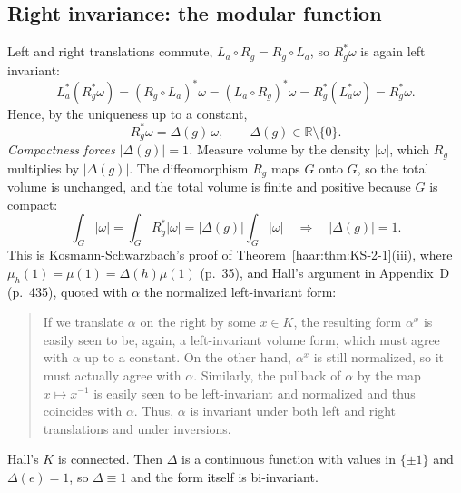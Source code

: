 \subsection{Right invariance: the modular function}\label{haar:sec:modular}
Left and right translations commute, $L_a\circ R_g=R_g\circ L_a$, so
$R_g^*\omega$ is again left invariant:
\begin{equation}
 L_a^*(R_g^*\omega)=(R_g\circ L_a)^*\omega=(L_a\circ R_g)^*\omega
 =R_g^*(L_a^*\omega)=R_g^*\omega .
\end{equation}
Hence, by the uniqueness up to a constant,
\begin{equation}\label{haar:modular-def}
 R_g^*\omega=\Delta(g)\,\omega,\qquad \Delta(g)\in\mathbb R\setminus\{0\}.
\end{equation}
\emph{Compactness forces $|\Delta(g)|=1$.} Measure volume by the density
$|\omega|$, which $R_g$ multiplies by $|\Delta(g)|$. The diffeomorphism $R_g$
maps $G$ onto $G$, so the total volume is unchanged, and the total volume is
finite and positive because $G$ is compact:
\begin{equation}\label{haar:modular-one}
 \int_G|\omega|=\int_GR_g^*|\omega|=|\Delta(g)|\int_G|\omega|
 \quad\Longrightarrow\quad |\Delta(g)|=1 .
\end{equation}
This is Kosmann-Schwarzbach's proof of Theorem~\ref{haar:thm:KS-2-1}(iii),
where $\mu_h(1)=\mu(1)=\Delta(h)\mu(1)$ (p.~35), and Hall's argument in
Appendix~D (p.~435), quoted with $\alpha$ the normalized left-invariant form:
\begin{quote}
If we translate $\alpha$ on the right by some $x\in K$, the resulting form
$\alpha^x$ is easily seen to be, again, a left-invariant volume form, which
must agree with $\alpha$ up to a constant. On the other hand, $\alpha^x$ is
still normalized, so it must actually agree with $\alpha$. Similarly, the
pullback of $\alpha$ by the map $x\mapsto x^{-1}$ is easily seen to be
left-invariant and normalized and thus coincides with $\alpha$. Thus,
$\alpha$ is invariant under both left and right translations and under
inversions.
\end{quote}
Hall's $K$ is connected. Then $\Delta$ is a continuous function with values
in $\{\pm1\}$ and $\Delta(e)=1$, so $\Delta\equiv1$ and the form itself is
bi-invariant.

